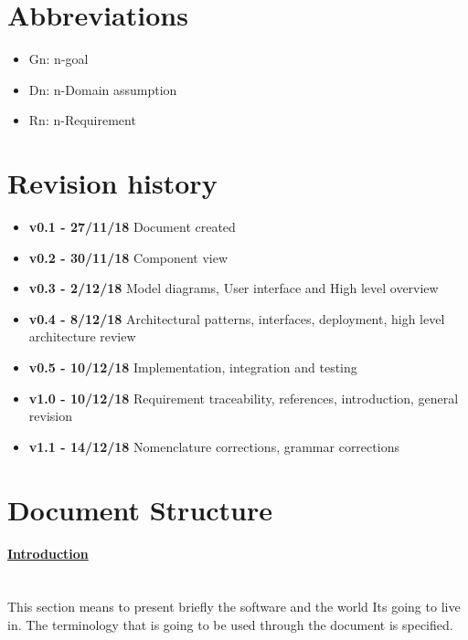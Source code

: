 \section{Abbreviations}
\begin{itemize}
\item Gn: n-goal
\item Dn: n-Domain assumption
\item Rn: n-Requirement
\end{itemize}

\section{Revision history}
\begin{itemize}
\item \textbf{v0.1 - 27/11/18} Document created
\item \textbf{v0.2 - 30/11/18} Component view
\item \textbf{v0.3 - 2/12/18} Model diagrams, User interface and High level overview
\item \textbf{v0.4 - 8/12/18} Architectural patterns, interfaces, deployment, high level architecture review
\item \textbf{v0.5 - 10/12/18} Implementation, integration and testing 
\item \textbf{v1.0 - 10/12/18} Requirement traceability, references, introduction, general revision
\item \textbf{v1.1 - 14/12/18} Nomenclature corrections, grammar corrections
\end{itemize}
\section{Document Structure}
\paragraph{\hyperref[sect:introduction]{Introduction}} \mbox{}\\
This section means to present briefly the software and the world It\textquotesingle s going to live in. The terminology that is going to be used through the document is specified.
